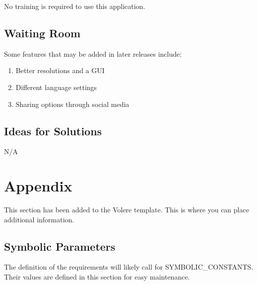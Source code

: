 \documentclass[12pt, titlepage]{article}
\begin{document}
No training is required to use this application. 

\subsection{Waiting Room}

Some features that may be added in later releases include:

\begin{enumerate}
    \item Better resolutions and a GUI
    \item Different language settings
    \item Sharing options through social media
\end{enumerate}

\subsection{Ideas for Solutions}

N/A





\newpage

\section{Appendix}

This section has been added to the Volere template.  This is where you can place
additional information.

\subsection{Symbolic Parameters}

The definition of the requirements will likely call for SYMBOLIC\_CONSTANTS.
Their values are defined in this section for easy maintenance.
\end{document}
